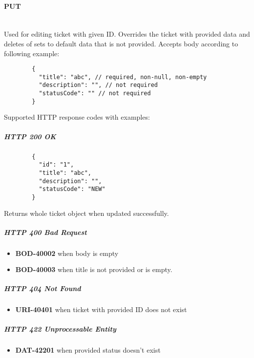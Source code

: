 \documentclass[a4paper]{article}
\newcommand{\newLineParagraph}[1]{\paragraph{#1}\mbox{}\\}
\begin{document}
    \newLineParagraph{PUT}
    Used for editing ticket with given ID. Overrides the ticket with provided data and deletes of sets to default data that is not provided. Accepts body according to following example:
    \begin{verbatim}
        {
          "title": "abc", // required, non-null, non-empty
          "description": "", // not required
          "statusCode": "" // not required
        }
    \end{verbatim}
    Supported HTTP response codes with examples:
    \subparagraph{HTTP 200 OK}
    \begin{verbatim}
        {
          "id": "1",
          "title": "abc",
          "description": "",
          "statusCode": "NEW"
        }
    \end{verbatim}
    Returns whole ticket object when updated successfully.
    \subparagraph{HTTP 400 Bad Request}
    \begin{itemize}
        \item \textbf{BOD-40002} when body is empty
        \item \textbf{BOD-40003} when title is not provided or is empty.
    \end{itemize}
    \subparagraph{HTTP 404 Not Found}
    \begin{itemize}
        \item \textbf{URI-40401} when ticket with provided ID does not exist
    \end{itemize}
    \subparagraph{HTTP 422 Unprocessable Entity}
    \begin{itemize}
        \item \textbf{DAT-42201} when provided status doesn't exist
    \end{itemize}
\end{document}
